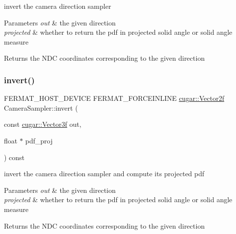 invert the camera direction sampler


\begin{DoxyParams}{Parameters}
{\em out} & the given direction \\
\hline
{\em projected} & whether to return the pdf in projected solid angle or solid angle measure \\
\hline
\end{DoxyParams}
\begin{DoxyReturn}{Returns}
the N\+DC coordinates corresponding to the given direction 
\end{DoxyReturn}
\mbox{\label{struct_camera_sampler_aaa68e077536fc88429fb35dd04d30af1}} 
\subsubsection{\texorpdfstring{invert()}{invert()}\hspace{0.1cm}{\footnotesize\ttfamily [2/2]}}
{\footnotesize\ttfamily F\+E\+R\+M\+A\+T\+\_\+\+H\+O\+S\+T\+\_\+\+D\+E\+V\+I\+CE F\+E\+R\+M\+A\+T\+\_\+\+F\+O\+R\+C\+E\+I\+N\+L\+I\+NE \hyperlink{structcugar_1_1_vector}{cugar\+::\+Vector2f} Camera\+Sampler\+::invert (\begin{DoxyParamCaption}\item[{const \hyperlink{structcugar_1_1_vector}{cugar\+::\+Vector3f}}]{out,  }\item[{float $\ast$}]{pdf\+\_\+proj }\end{DoxyParamCaption}) const\hspace{0.3cm}{\ttfamily [inline]}}

invert the camera direction sampler and compute its projected pdf


\begin{DoxyParams}{Parameters}
{\em out} & the given direction \\
\hline
{\em projected} & whether to return the pdf in projected solid angle or solid angle measure \\
\hline
\end{DoxyParams}
\begin{DoxyReturn}{Returns}
the N\+DC coordinates corresponding to the given direction 
\end{DoxyReturn}
\mbox{\label{struct_camera_sampler_a0edd94ccee6da3180f13845d189bc758}} 
